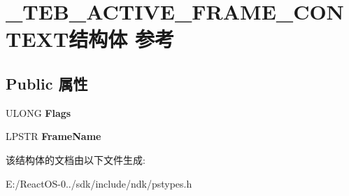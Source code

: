 \hypertarget{struct___t_e_b___a_c_t_i_v_e___f_r_a_m_e___c_o_n_t_e_x_t}{}\section{\+\_\+\+T\+E\+B\+\_\+\+A\+C\+T\+I\+V\+E\+\_\+\+F\+R\+A\+M\+E\+\_\+\+C\+O\+N\+T\+E\+X\+T结构体 参考}
\label{struct___t_e_b___a_c_t_i_v_e___f_r_a_m_e___c_o_n_t_e_x_t}
\subsection*{Public 属性}
\begin{DoxyCompactItemize}
\item 
\mbox{\label{struct___t_e_b___a_c_t_i_v_e___f_r_a_m_e___c_o_n_t_e_x_t_afe35115a1d97dae0b38fec64f530f5bb}} 
U\+L\+O\+NG {\bfseries Flags}
\item 
\mbox{\label{struct___t_e_b___a_c_t_i_v_e___f_r_a_m_e___c_o_n_t_e_x_t_aa1449d331d3d1eb8106a016052f21b18}} 
L\+P\+S\+TR {\bfseries Frame\+Name}
\end{DoxyCompactItemize}


该结构体的文档由以下文件生成\+:\begin{DoxyCompactItemize}
\item 
E\+:/\+React\+O\+S-\/0../sdk/include/ndk/pstypes.\+h\end{DoxyCompactItemize}
